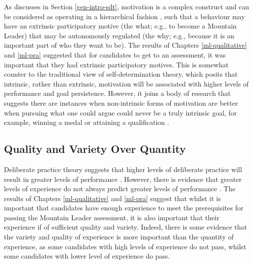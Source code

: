\documentclass[
  12pt,
  a4paper,
]{book}
\begin{document}
As discusses in Section \ref{gen-intro-sdt}, motivation is a complex construct and can be considered as operating in a hierarchical fashion \citep{Ingledew2009, Vallerand1997, Vallerand2002}, such that a behaviour may have an extrinsic participatory motive (the what; e.g., to become a Mountain Leader) that may be autonomously regulated (the why; e.g., because it is an important part of who they want to be). The results of Chapters \ref{ml-qualitative} and \ref{ml-pra} suggested that for candidates to get to an assessment, it was important that they had extrinsic participatory motives. This is somewhat counter to the traditional view of self-determination theory, which posits that intrinsic, rather than extrinsic, motivation will be associated with higher levels of performance and goal persistence. However, it joins a body of research that suggests there are instances when non-intrinsic forms of motivation are better when pursuing what one could argue could never be a truly intrinsic goal, for example, winning a medal or attaining a qualification \citetext{\citealp[e.g.,][\citet{Fortier1995}]{Chantal1996}; \citealp{Gullich2019}; \citealp{Hardy2017}}.

\hypertarget{quality-and-variety-over-quantity}{%
\subsection{Quality and Variety Over Quantity}\label{quality-and-variety-over-quantity}}

Deliberate practice theory suggests that higher levels of deliberate practice will result in greater levels of performance \citep{Ericsson1993}. However, there is evidence that greater levels of experience do not always predict greater levels of performance \citep[see][ Section 4.1 for a review]{Rees2016}. The results of Chapters \ref{ml-qualitative} and \ref{ml-pra} suggest that whilst it is important that candidates have enough experience to meet the prerequisites for passing the Mountain Leader assessment, it is also important that their experience if of sufficient quality and variety. Indeed, there is some evidence that the variety and quality of experience is more important than the quantity of experience, as some candidates with high levels of experience do not pass, whilst some candidates with lower level of experience do pass.
\end{document}

